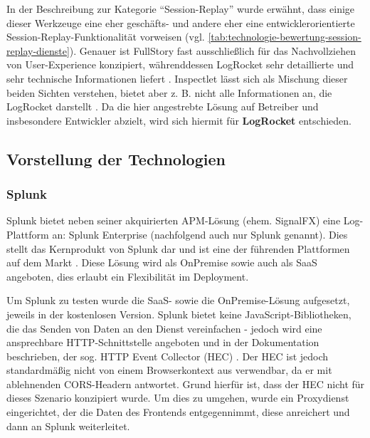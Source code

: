 

In der Beschreibung zur Kategorie \enquote{Session-Replay} wurde erwähnt, dass einige dieser Werkzeuge eine eher geschäfts- und andere eher eine entwicklerorientierte Session-Replay-Funktionalität vorweisen (vgl. \autoref{tab:technologie-bewertung-session-replay-dienste}). Genauer ist FullStory fast ausschließlich für das Nachvollziehen von User-Experience konzipiert, währenddessen LogRocket sehr detaillierte und sehr technische Informationen liefert \cite{Webalyt}. Inspectlet lässt sich als Mischung dieser beiden Sichten verstehen, bietet aber z. B. nicht alle Informationen an, die LogRocket darstellt  \cite{Webalyt}. Da die hier angestrebte Lösung auf Betreiber und insbesondere Entwickler abzielt, wird sich hiermit für \textbf{LogRocket} entschieden.



\subsection{Vorstellung der Technologien}

\subsubsection{Splunk}
\label{subsec:splunk}

Splunk bietet neben seiner akquirierten APM-Lösung (ehem. SignalFX) eine Log-Plattform an: Splunk Enterprise (nachfolgend auch nur Splunk genannt). Dies stellt das Kernprodukt von Splunk dar und ist eine der führenden Plattformen auf dem Markt \cite{ThreatIdentificationFromAccessLogsUsingElasticStack}. Diese Lösung wird als OnPremise sowie auch als SaaS angeboten, dies erlaubt ein Flexibilität im Deployment.

Um Splunk zu testen wurde die SaaS- sowie die OnPremise-Lösung aufgesetzt, jeweils in der kostenlosen Version. Splunk bietet keine JavaScript-Bibliotheken, die das Senden von Daten an den Dienst vereinfachen - jedoch wird eine ansprechbare HTTP-Schnittstelle angeboten und in der Dokumentation beschrieben, der sog. HTTP Event Collector (HEC) \cite{SplunkHEC}. Der HEC ist jedoch standardmäßig nicht von einem Browserkontext aus verwendbar, da er mit ablehnenden CORS-Headern antwortet. Grund hierfür ist, dass der HEC nicht für dieses Szenario konzipiert wurde. Um dies zu umgehen, wurde ein Proxydienst eingerichtet, der die Daten des Frontends entgegennimmt, diese anreichert und dann an Splunk weiterleitet.

